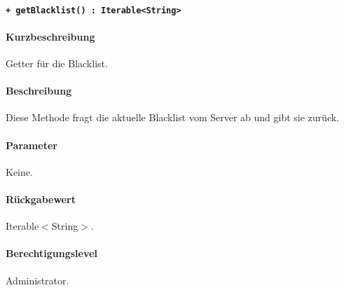 \paragraph{\texttt{+ getBlacklist() : Iterable<String>}}\label{AP_Backend_getBlacklist}%
\paragraph*{Kurzbeschreibung}
Getter für die Blacklist.
\paragraph*{Beschreibung}
Diese Methode fragt die aktuelle Blacklist vom Server ab und gibt sie zurück.
\paragraph*{Parameter}
Keine.
\paragraph*{Rückgabewert}
Iterable$<$String$>$.
\paragraph*{Berechtigungslevel}
Administrator.